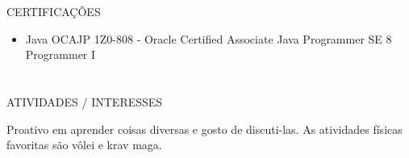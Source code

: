 \documentclass{my_cvPT}
\begin{document}
\begin{multicols}{2}
\section{\faStar}{CERTIFICAÇÕES}

\begin{itemize}[noitemsep]
    \item Java OCAJP 1Z0-808 - Oracle Certified Associate Java Programmer SE 8 Programmer I
\end{itemize}

\section{\faSoccerBallO}{ATIVIDADES / INTERESSES}

Proativo em aprender coisas diversas e gosto de discuti-las. As atividades físicas favoritas são vôlei e krav maga.


\end{multicols}
\end{document}
